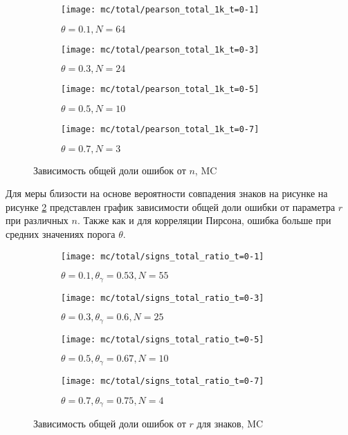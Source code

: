 \begin{figure}[H]
     \centering
     \begin{subfigure}[b]{0.49\textwidth}
         \centering
         \texttt{[image: mc/total/pearson\_total\_1k\_t=0-1]}
         \caption{$\theta=0.1, N=64$}
     \end{subfigure}
     \hfill
     \begin{subfigure}[b]{0.49\textwidth}
         \centering
         \texttt{[image: mc/total/pearson\_total\_1k\_t=0-3]}
         \caption{$\theta=0.3, N=24$}
     \end{subfigure}
     \vfill
     \begin{subfigure}[b]{0.49\textwidth}
         \centering
         \texttt{[image: mc/total/pearson\_total\_1k\_t=0-5]}
         \caption{$\theta=0.5, N=10$}
     \end{subfigure}
     \hfill
     \begin{subfigure}[b]{0.49\textwidth}
         \centering
         \texttt{[image: mc/total/pearson\_total\_1k\_t=0-7]}
         \caption{$\theta=0.7, N=3$}
     \end{subfigure}
    
        \caption{Зависимость общей доли ошибок от $n$,  MC}
        \label{fig:exp/mc/total_1k}
\end{figure}  

Для меры близости на основе вероятности совпадения знаков на рисунке на рисунке \ref{fig:exp/mc/signs_ratio_total} представлен график зависимости общей доли ошибки от параметра $r$ при различных $n$. Также как и для корреляции Пирсона, ошибка больше при средних значениях порога $\theta$.

\begin{figure}[H]
     \centering
     \begin{subfigure}[b]{0.49\textwidth}
         \centering
         \texttt{[image: mc/total/signs\_total\_ratio\_t=0-1]}
         \caption{$\theta=0.1, \theta_\gamma=0.53, N=55$}
     \end{subfigure}
     \hfill
     \begin{subfigure}[b]{0.49\textwidth}
         \centering
         \texttt{[image: mc/total/signs\_total\_ratio\_t=0-3]}
         \caption{$\theta=0.3, \theta_\gamma=0.6, N=25$}
     \end{subfigure}
     \vfill
     \begin{subfigure}[b]{0.49\textwidth}
         \centering
         \texttt{[image: mc/total/signs\_total\_ratio\_t=0-5]}
         \caption{$\theta=0.5, \theta_\gamma=0.67, N=10$}
     \end{subfigure}
     \hfill
     \begin{subfigure}[b]{0.49\textwidth}
         \centering
         \texttt{[image: mc/total/signs\_total\_ratio\_t=0-7]}
         \caption{$\theta=0.7,\theta_\gamma=0.75, N=4$}
     \end{subfigure}

        \caption{Зависимость общей доли ошибок от $r$ для знаков, MC}
        \label{fig:exp/mc/signs_ratio_total}
\end{figure}  

